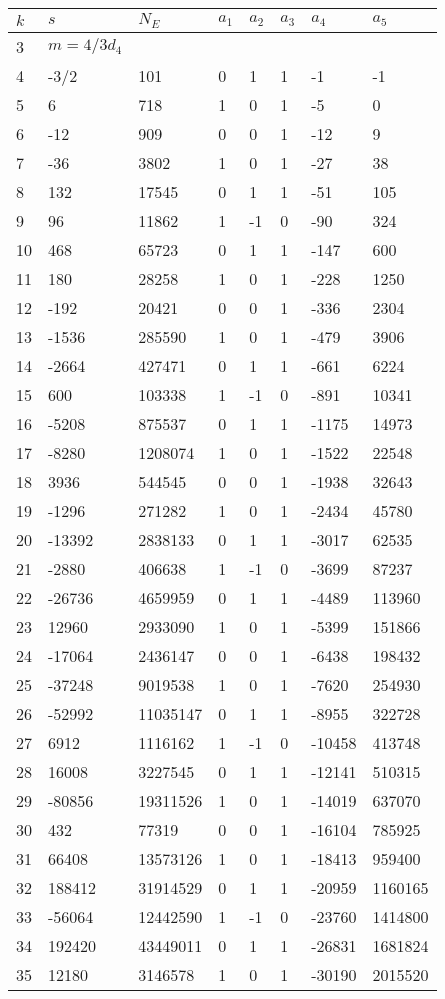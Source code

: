 \documentclass{amsart}
\begin{document}
\begin{longtable}{|l|l|l|lllll|}
\hline
$k$ & $s$ & $N_E$ & $a_1$ & $a_2$ & $a_3$ & $a_4$ & $a_5$\\
\hline
3&$m=4/3d_{4}$&&\multicolumn{5}{c|}{}\\
4&-3/2&101&0&1&1&-1&-1\\
5&6&718&1&0&1&-5&0\\
6&-12&909&0&0&1&-12&9\\
7&-36&3802&1&0&1&-27&38\\
8&132&17545&0&1&1&-51&105\\
9&96&11862&1&-1&0&-90&324\\
10&468&65723&0&1&1&-147&600\\
11&180&28258&1&0&1&-228&1250\\
12&-192&20421&0&0&1&-336&2304\\
13&-1536&285590&1&0&1&-479&3906\\
14&-2664&427471&0&1&1&-661&6224\\
15&600&103338&1&-1&0&-891&10341\\
16&-5208&875537&0&1&1&-1175&14973\\
17&-8280&1208074&1&0&1&-1522&22548\\
18&3936&544545&0&0&1&-1938&32643\\
19&-1296&271282&1&0&1&-2434&45780\\
20&-13392&2838133&0&1&1&-3017&62535\\
21&-2880&406638&1&-1&0&-3699&87237\\
22&-26736&4659959&0&1&1&-4489&113960\\
23&12960&2933090&1&0&1&-5399&151866\\
24&-17064&2436147&0&0&1&-6438&198432\\
25&-37248&9019538&1&0&1&-7620&254930\\
26&-52992&11035147&0&1&1&-8955&322728\\
27&6912&1116162&1&-1&0&-10458&413748\\
28&16008&3227545&0&1&1&-12141&510315\\
29&-80856&19311526&1&0&1&-14019&637070\\
30&432&77319&0&0&1&-16104&785925\\
31&66408&13573126&1&0&1&-18413&959400\\
32&188412&31914529&0&1&1&-20959&1160165\\
33&-56064&12442590&1&-1&0&-23760&1414800\\
34&192420&43449011&0&1&1&-26831&1681824\\
35&12180&3146578&1&0&1&-30190&2015520\\

\end{longtable}
\end{document}
